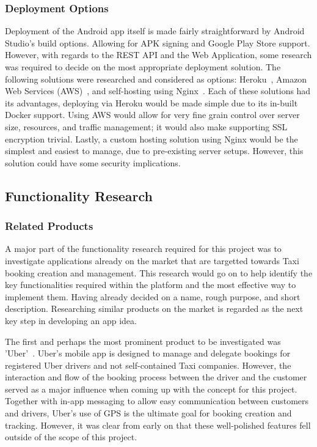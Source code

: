 \subsubsection{Deployment Options}
Deployment of the Android app itself is made fairly straightforward by Android Studio's build options. Allowing for APK signing and Google Play Store support. However, with regards to the REST API and the Web Application, some research was required to decide on the most appropriate deployment solution. The following solutions were researched and considered as options: Heroku~\cite{heroku_documentation_ref}, Amazon Web Services (AWS)~\cite{aws_documentation_ref}, and self-hosting using Nginx~\cite{nginx_documentation_ref}. Each of these solutions had its advantages, deploying via Heroku would be made simple due to its in-built Docker support. Using AWS would allow for very fine grain control over server size, resources, and traffic management; it would also make supporting SSL encryption trivial. Lastly, a custom hosting solution using Nginx would be the simplest and easiest to manage, due to pre-existing server setups. However, this solution could have some security implications.

\subsection{Functionality Research}
\subsubsection{Related Products}
A major part of the functionality research required for this project was to investigate applications already on the market that are targetted towards Taxi booking creation and management. This research would go on to help identify the key functionalities required within the platform and the most effective way to implement them. Having already decided on a name, rough purpose, and short description. Researching similar products on the market is regarded as the next key step in developing an app idea.

The first and perhaps the most prominent product to be investigated was 'Uber'~\cite{uber_documentation_ref}. Uber's mobile app is designed to manage and delegate bookings for registered Uber drivers and not self-contained Taxi companies. However, the interaction and flow of the booking process between the driver and the customer served as a major influence when coming up with the concept for this project. Together with in-app messaging to allow easy communication between customers and drivers, Uber's use of GPS  is the ultimate goal for booking creation and tracking. However, it was clear from early on that these well-polished features fell outside of the scope of this project.

